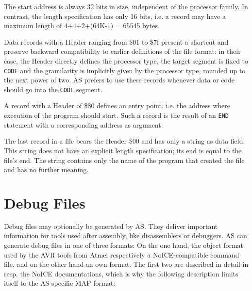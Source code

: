 \documentclass[12pt,twoside]{report}
\newcommand{\tty}[1]{{\tt #1}}
\newcommand{\asname}{{AS}}
\begin{document}
The start address is always 32 bits in size, independent of the
processor family.  In contrast, the length specification has only 16
bits, i.e. a record may have a maximum length of 4+4+2+(64K-1) =
65545 bytes.

Data records with a Header ranging from \$01 to \$7f present a shortcut
and preserve backward compatibility to earlier definitions of the
file format: in their case, the Header directly defines the processor
type, the target segment is fixed to \tty{CODE} and the granularity is
implicitly given by the processor type, rounded up to the next power
of two.  \asname{} prefers to use these records whenever data or code should
go into the \tty{CODE} segment.

A record with a Header of \$80 defines an entry point, i.e. the
address where execution of the program should start.  Such a record
is the result of an \tty{END} statement with a corresponding address as
argument.

The last record in a file bears the Header \$00 and has only a string
as data field.  This string does not have an explicit length
specification; its end is equal to the file's end.  The string
contains only the name of the program that created the file and has
no further meaning.


\section{Debug Files}
\label{SectDebugFormat}

Debug files may optionally be generated by \asname{}.  They deliver important
information for tools used after assembly, like disassemblers or
debuggers.  \asname{} can generate debug files in one of three formats: On the
one hand, the object format used by the AVR tools from Atmel respectively
a NoICE-compatible command file, and on the other hand an own format.  The
first two are described in detail in \cite{AVRObj} resp. the NoICE
documentations, which is why the following description limits itself to
the \asname{}-specific MAP format:
\end{document}
